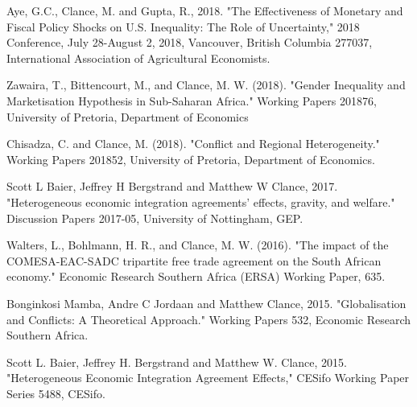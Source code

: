 \documentclass[margin,line]{res}                          %
\newenvironment{list1}{
  \begin{list}{\ding{113}}{%
      \setlength{\itemsep}{0.4em}
      \setlength{\parsep}{0in} \setlength{\parskip}{0in}
      \setlength{\topsep}{0in} \setlength{\partopsep}{0in} 
      \setlength{\leftmargin}{0.17in}}}{\end{list}}
\begin{document}
\begin{resume}
\begin{list1}
\item[] Aye, G.C., Clance, M. and Gupta, R., 2018. "The Effectiveness of Monetary and Fiscal Policy Shocks on U.S. Inequality: The Role of Uncertainty," 2018 Conference, July 28-August 2, 2018, Vancouver, British Columbia 277037, International Association of Agricultural Economists.
\item[] Zawaira, T., Bittencourt, M., and Clance, M. W. (2018). "Gender Inequality and Marketisation Hypothesis in Sub-Saharan Africa." Working Papers 201876, University of Pretoria, Department of Economics
\item[] Chisadza, C. and Clance, M. (2018). "Conflict and Regional Heterogeneity." Working Papers 201852, University of Pretoria, Department of Economics.
\item[] Scott L Baier, Jeffrey H Bergstrand and Matthew W Clance, 2017. "Heterogeneous economic integration agreements' effects, gravity, and welfare." Discussion Papers 2017-05, University of Nottingham, GEP.
\item[] Walters, L., Bohlmann, H. R., and Clance, M. W. (2016). "The impact of the COMESA-EAC-SADC tripartite free trade agreement on the South African economy." Economic Research Southern Africa (ERSA) Working Paper, 635.
\item[] Bonginkosi Mamba, Andre C Jordaan and Matthew Clance, 2015. "Globalisation and Conflicts: A Theoretical Approach." Working Papers 532, Economic Research Southern Africa.
\item[] Scott L. Baier, Jeffrey H. Bergstrand and Matthew W. Clance, 2015. "Heterogeneous Economic Integration Agreement Effects," CESifo Working Paper Series 5488, CESifo.

\end{list1}


\end{resume}
\end{document}
